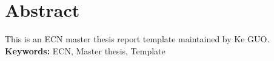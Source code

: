   \section*{Abstract}
  \noindent
This is an ECN master thesis report template maintained by Ke GUO.\\

 \noindent
 \textbf{Keywords:} ECN, Master thesis, Template